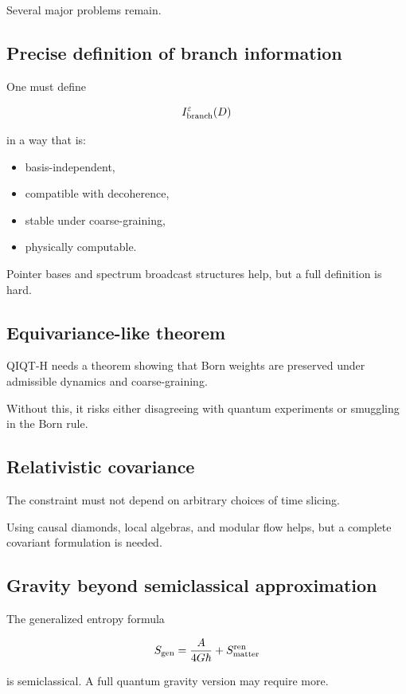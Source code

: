 \documentclass[11pt,a4paper]{article}
\begin{document}
Several major problems remain.

\subsection{Precise definition of branch information}

One must define

\[
I_{\rm branch}^{\varepsilon}(D)
\]

in a way that is:

\begin{itemize}
  \item basis-independent,
  \item compatible with decoherence,
  \item stable under coarse-graining,
  \item physically computable.
\end{itemize}

Pointer bases and spectrum broadcast structures help, but a full definition is hard.

\subsection{Equivariance-like theorem}

QIQT-H needs a theorem showing that Born weights are preserved under admissible dynamics and coarse-graining.

Without this, it risks either disagreeing with quantum experiments or smuggling in the Born rule.

\subsection{Relativistic covariance}

The constraint must not depend on arbitrary choices of time slicing.

Using causal diamonds, local algebras, and modular flow helps, but a complete covariant formulation is needed.

\subsection{Gravity beyond semiclassical approximation}

The generalized entropy formula

\[
S_{\rm gen}=\frac{A}{4G\hbar}+S_{\rm matter}^{\rm ren}
\]

is semiclassical. A full quantum gravity version may require more.
\end{document}
